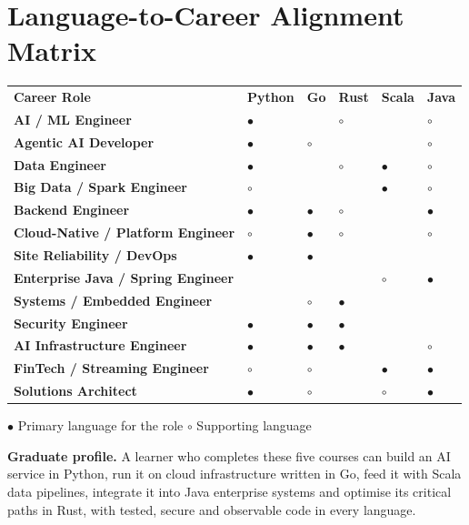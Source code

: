 \section*{Language-to-Career Alignment Matrix}
\renewcommand{\arraystretch}{1.1}
{\small
\newcommand{\y}{\cellcolor{gold!55}\color{navy}\textbf{$\bullet$}}
\newcommand{\p}{\cellcolor{goldlight}\color{navymid}$\circ$}
\begin{tabularx}{\textwidth}{>{\bfseries\leavevmode\color{navy}}X *{5}{>{\centering\arraybackslash}p{1.5cm}}}
\rowcolor{navy}\leavevmode\color{white}\textbf{Career Role} & \leavevmode\color{white}\textbf{Python} & \leavevmode\color{white}\textbf{Go} & \leavevmode\color{white}\textbf{Rust} & \leavevmode\color{white}\textbf{Scala} & \leavevmode\color{white}\textbf{Java}\\
AI / ML Engineer                 & \y &    & \p &    & \p \\
Agentic AI Developer             & \y & \p &    &    & \p \\
Data Engineer                    & \y &    & \p & \y & \p \\
Big Data / Spark Engineer        & \p &    &    & \y & \p \\
Backend Engineer                 & \y & \y & \p &    & \y \\
Cloud-Native / Platform Engineer & \p & \y & \p &    & \p \\
Site Reliability / DevOps        & \y & \y &    &    &    \\
Enterprise Java / Spring Engineer&    &    &    & \p & \y \\
Systems / Embedded Engineer      &    & \p & \y &    &    \\
Security Engineer                & \y & \y & \y &    &    \\
AI Infrastructure Engineer       & \y & \y & \y &    & \p \\
FinTech / Streaming Engineer     & \p & \p &    & \y & \y \\
Solutions Architect              & \y & \p &    & \p & \y \\
\bottomrule
\end{tabularx}
\par\vspace{4pt}
\colorbox{gold!55}{\color{navy}\textbf{$\bullet$}} Primary language for the role \qquad
\colorbox{goldlight}{\color{navymid}$\circ$} Supporting language}

\vspace{10pt}
\begin{tcolorbox}[enhanced,colback=navylight,colframe=navy,boxrule=0.8pt,arc=2pt,
  borderline west={4pt}{0pt}{gold}]
\small\color{navy}
\textbf{Graduate profile.} A learner who completes these five courses can build an AI service in Python, run it on cloud infrastructure
written in Go, feed it with Scala data pipelines, integrate it into Java enterprise systems and optimise its critical paths in Rust,
with tested, secure and observable code in every language.
\end{tcolorbox}




